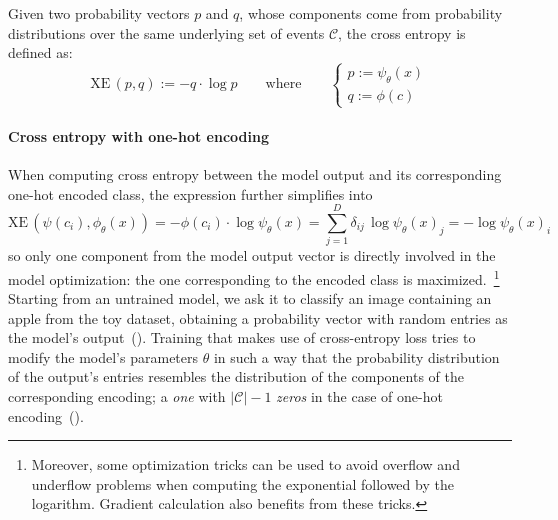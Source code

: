 Given two probability vectors $p$ and $q$, whose components come from probability distributions over the same underlying set of events $\mathcal{C}$, the cross entropy is defined as:
\begin{equation}
  \textrm{XE} \, (p, q) := - q \cdot \log p
  \label{eq:cross-entropy}
  \qquad \textrm{where} \qquad
  \begin{cases}
    p := \psi_\theta(x) \\
    q := \phi(c)
  \end{cases}
\end{equation}

\paragraph{Cross entropy with one-hot encoding} When computing cross entropy between the model output and its corresponding one-hot encoded class, the expression further simplifies into
\begin{equation*}
  \textrm{XE} \, (\psi(c_i),\phi_\theta(x))
  = - \phi(c_i) \cdot \log \psi_\theta(x)
  = \sum_{j = 1}^D \delta_{ij} \, \log \psi_\theta(x)_j
  = - \log \psi_\theta(x)_i
  \label{eq:cross-entropy-one-hot-encoding}
\end{equation*}
so only one component from the model output vector is directly involved in the model optimization: the one corresponding to the encoded class is maximized.~\footnote{Moreover, some optimization tricks can be used to avoid overflow and underflow problems when computing the exponential followed by the logarithm. Gradient calculation also benefits from these tricks.} %
Starting from an untrained model, we ask it to classify an image containing an apple from the toy dataset, obtaining a probability vector with random entries as the model's output~(). Training that makes use of cross-entropy loss tries to modify the model's parameters $\theta$ in such a way that the probability distribution of the output's entries resembles the distribution of the components of the corresponding encoding; a \emph{one} with $|\mathcal{C}| - 1$ \emph{zeros} in the case of one-hot encoding~().
